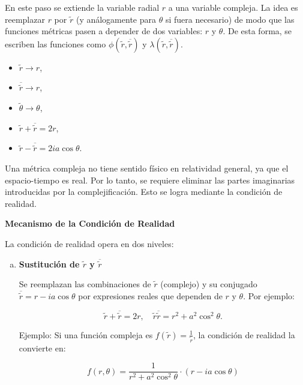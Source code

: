 \begin{enumerate}[1.]
          En este paso se extiende la variable radial $r$ a una variable compleja. La idea es reemplazar $r$ por $\tilde{r}$ (y análogamente para $\theta$ si fuera necesario) de modo que las funciones métricas pasen a depender de dos variables: $r$ y $\theta$. De esta forma, se escriben las funciones como $\phi(\tilde{r}, \overline{\tilde{r}})$ y $\lambda(\tilde{r}, \overline{\tilde{r}})$.

          \begin{itemize}
              \item $\tilde{r} \rightarrow r$,
              \item $\overline{\tilde{r}} \rightarrow r$,
              \item $\tilde{\theta} \rightarrow \theta$,
              \item $\tilde{r} + \overline{\tilde{r}} = 2r$,
              \item $\tilde{r} - \overline{\tilde{r}} = 2ia \cos \theta$.
          \end{itemize}
          \begin{note}
              Una métrica compleja no tiene sentido físico en relatividad general, ya que el espacio-tiempo es real. Por lo tanto, se requiere eliminar las partes imaginarias introducidas por la complejificación. Esto se logra mediante la condición de realidad.

              \textbf{Mecanismo de la Condición de Realidad}

              La condición de realidad opera en dos niveles:
              \begin{enumerate}[a.]
                  \item \textbf{Sustitución de $\tilde{r}$ y $\overline{\tilde{r}}$}

                        Se reemplazan las combinaciones de $\tilde{r}$ (complejo) y su conjugado $\overline{\tilde{r}} = r - ia \cos \theta$ por expresiones reales que dependen de $r$ y $\theta$. Por ejemplo:

                        $$
                            \tilde{r} + \overline{\tilde{r}} = 2r, \quad \tilde{r} \overline{\tilde{r}} = r^2 + a^2 \cos^2 \theta.
                        $$

                        Ejemplo:
                        Si una función compleja es $f(\tilde{r}) = \frac{1}{\tilde{r}}$, la condición de realidad la convierte en:

                        $$
                            f(r, \theta) = \frac{1}{r^2 + a^2 \cos^2 \theta} \cdot (r - ia \cos \theta)
                        $$


\end{enumerate}
\end{note}
\end{enumerate}
